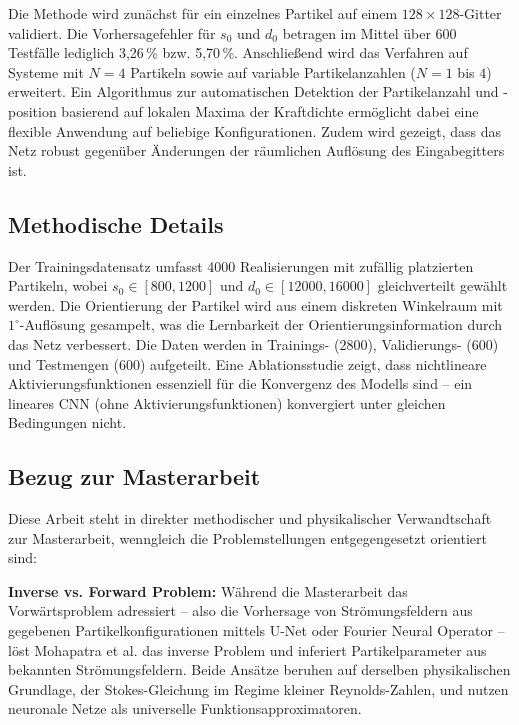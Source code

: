\documentclass[a4paper,12pt]{article}
\begin{document}
Die Methode wird zunächst für ein einzelnes Partikel auf einem $128 \times 128$-Gitter validiert. Die Vorhersagefehler für $s_0$ und $d_0$ betragen im Mittel über 600 Testfälle lediglich 3{,}26\,\% bzw. 5{,}70\,\%. Anschließend wird das Verfahren auf Systeme mit $N = 4$ Partikeln sowie auf variable Partikelanzahlen ($N = 1$ bis $4$) erweitert. Ein Algorithmus zur automatischen Detektion der Partikelanzahl und -position basierend auf lokalen Maxima der Kraftdichte ermöglicht dabei eine flexible Anwendung auf beliebige Konfigurationen. Zudem wird gezeigt, dass das Netz robust gegenüber Änderungen der räumlichen Auflösung des Eingabegitters ist.

\subsection*{Methodische Details}

Der Trainingsdatensatz umfasst 4000 Realisierungen mit zufällig platzierten Partikeln, wobei $s_0 \in [800, 1200]$ und $d_0 \in [12000, 16000]$ gleichverteilt gewählt werden. Die Orientierung der Partikel wird aus einem diskreten Winkelraum mit $1^\circ$-Auflösung gesampelt, was die Lernbarkeit der Orientierungsinformation durch das Netz verbessert. Die Daten werden in Trainings- ($2800$), Validierungs- ($600$) und Testmengen ($600$) aufgeteilt. Eine Ablationsstudie zeigt, dass nichtlineare Aktivierungsfunktionen essenziell für die Konvergenz des Modells sind – ein lineares CNN (ohne Aktivierungsfunktionen) konvergiert unter gleichen Bedingungen nicht.

\subsection*{Bezug zur Masterarbeit}

Diese Arbeit steht in direkter methodischer und physikalischer Verwandtschaft zur Masterarbeit, wenngleich die Problemstellungen entgegengesetzt orientiert sind:

\textbf{Inverse vs. Forward Problem:} Während die Masterarbeit das Vorwärtsproblem adressiert – also die Vorhersage von Strömungsfeldern aus gegebenen Partikelkonfigurationen mittels U-Net oder Fourier Neural Operator – löst Mohapatra et al. das inverse Problem und inferiert Partikelparameter aus bekannten Strömungsfeldern. Beide Ansätze beruhen auf derselben physikalischen Grundlage, der Stokes-Gleichung im Regime kleiner Reynolds-Zahlen, und nutzen neuronale Netze als universelle Funktionsapproximatoren.
\end{document}
